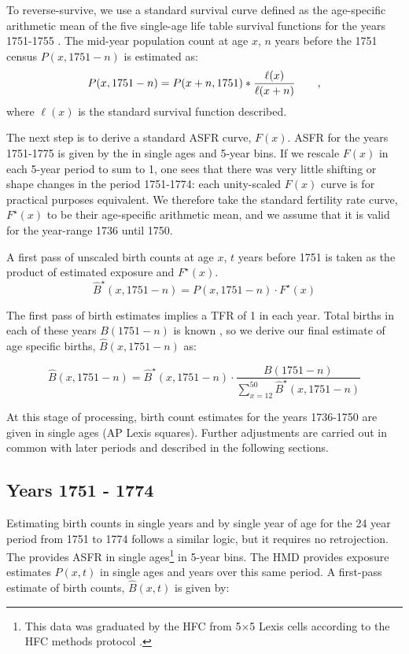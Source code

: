 To reverse-survive, we use a standard survival curve defined as the age-specific arithmetic mean of the five single-age life table survival functions for the years 1751-1755 \citep{HMD}. The mid-year population count at age $x$, $n$ years before the 1751 census $P(x,1751-n)$ is estimated as:
		\begin{equation}
\label{eq:Pxhat}
P(x,1751-n) = P(x+n,1751) * \frac{\ell(x)}{\ell(x+n)} \quad\quad\text{,}
\end{equation}
where $\ell(x)$ is the standard survival function described.

The next step is to derive a standard ASFR curve, $F(x)$. ASFR for the years 1751-1775 is given by the \citet{HFC} in single ages and 5-year bins. If we rescale $F(x)$ in each 5-year period to sum to 1, one sees that there was very little shifting or shape changes in the period 1751-1774: each unity-scaled $F(x)$ curve is for practical purposes equivalent. We therefore take the standard fertility rate curve, $F^\star(x)$ to be their age-specific arithmetic mean, and we assume that it is valid for the year-range 1736 until 1750.

A first pass of unscaled birth counts at age $x$, $t$ years before 1751 is taken as the product of estimated exposure and $F^\star(x)$.
\begin{equation}
\widehat{B}^\star(x,1751-n) = P(x,1751-n) \cdot F^\star(x)
\end{equation}

The first pass of birth estimates implies a TFR of 1 in each year. Total births in each of these years $B(1751-n)$ is known \citep[][Tab.~27 \& Tab.~28]{sweden1969historisk}, so we derive our final estimate of age specific births, $\widehat{B}(x,1751-n)$ as:
		
		\begin{equation}
\widehat{B}(x,1751-n) = \widehat{B}^\star(x,1751-n) \cdot \frac{B(1751-n)}{\sum _{x=12}^{50}\widehat{B}^\star(x,1751-n) }
\end{equation}

At this stage of processing, birth count estimates for the years 1736-1750 are given in single ages (AP Lexis squares). Further adjustments are carried out in common with later periods and described in the following sections.

\subsection{Years 1751 - 1774}
\label{sec:hfc}
Estimating birth counts in single years and by single year of age for the 24 year period from 1751 to 1774 follows a similar logic, but it requires no retrojection. The \citet{HFC} provides ASFR in single ages\footnote{This data was graduated by the HFC from 5$\times$5 Lexis cells according to the HFC methods protocol \citep{grigorieva2015methods}.} in 5-year bins. The HMD provides exposure estimates $P(x,t)$ in single ages and years over this same period. A first-pass estimate of birth counts, $\widehat{B}(x,t)$ is given by:
		

